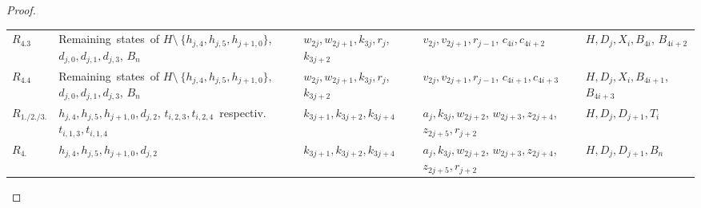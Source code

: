 \documentclass[english]{lipics_hacked}
\begin{document}
\begin{proof}
\begin{longtable}{p{0.9cm} p{3cm}   p{2.5cm}    p{2.5cm}      p{2.7cm}  }
 $R_{4.3}$ & Remaining~states~of $H\setminus~\{h_{j,4},h_{j,5},h_{j+1,0}\}$, $d_{j,0},d_{j,1},d_{j,3}$, $B_{n}$ & $w_{2j},w_{2j+1},k_{3j},r_j$, $k_{3j+2}$ & $v_{2j},v_{2j+1},r_{j-1}$, $c_{4i},c_{4i+2}$ & $H,D_j,X_i,B_{4i}$, $B_{4i+2}$\\
  $R_{4.4}$ & Remaining~states~of $H\setminus~\{h_{j,4},h_{j,5},h_{j+1,0}\}$, $d_{j,0},d_{j,1},d_{j,3}$, $B_{n}$ & $w_{2j},w_{2j+1},k_{3j},r_j$, $k_{3j+2}$ & $v_{2j},v_{2j+1},r_{j-1}$, $c_{4i+1},c_{4i+3}$ & $H,D_j,X_i,B_{4i+1}$, $B_{4i+3}$\\
   $R_{1./2./3.}$ & $h_{j,4},h_{j,5},h_{j+1,0},d_{j,2}$, $t_{i,2,3},t_{i,2,4}$~respectiv. $t_{i,1,3},t_{i,1,4}$ & $k_{3j+1},k_{3j+2},k_{3j+4}$ & $a_j,k_{3j},w_{2j+2}$, $w_{2j+3},z_{2j+4}$, $z_{2j+5}, r_{j+2}$ & $H,D_j,D_{j+1},T_i$\\	
%
$R_{4.}$ & $h_{j,4},h_{j,5},h_{j+1,0},d_{j,2}$  & $k_{3j+1},k_{3j+2},k_{3j+4}$ & $a_j,k_{3j},w_{2j+2}$, $w_{2j+3},z_{2j+4}$, $z_{2j+5}, r_{j+2}$ & $H,D_j,D_{j+1},B_n$\\	\end{longtable}
\end{proof}
\end{document}
